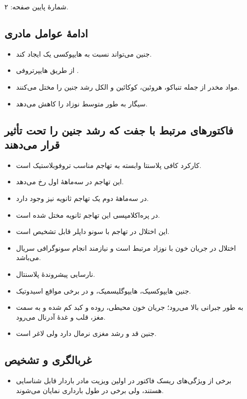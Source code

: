 \documentclass[12pt,a4paper]{article}
\begin{document}
\FGheader\par
شمارهٔ پایین صفحه: ۲.

\subsection*{ادامهٔ عوامل مادری}
\begin{itemize}
\item جنین می‌تواند نسبت به هایپوکسی یک  ایجاد کند.
\item از طریق هایپرتروفی .
\item مواد مخدر از جمله تنباکو، هروئین، کوکائین و الکل رشد جنین را مختل می‌کنند.
\item سیگار به طور متوسط  نوزاد را  کاهش می‌دهد.
\end{itemize}

\subsection*{فاکتورهای مرتبط با جفت که رشد جنین را تحت تأثیر قرار می‌دهند}
\begin{itemize}
\item کارکرد کافی پلاسنتا وابسته به تهاجم مناسب تروفوبلاستیک است.
\item این تهاجم در سه‌ماههٔ اول رخ می‌دهد.
\item در سه‌ماههٔ دوم یک تهاجم ثانویه نیز وجود دارد.
\item در پره‌اکلامپسی این تهاجم ثانویه مختل شده است.
\item این اختلال در تهاجم با سونو داپلر قابل تشخیص است.
\item اختلال در جریان خون با نوزاد  مرتبط است و نیازمند انجام سونوگرافی سریال می‌باشد.
\item نارسایی پیشروندهٔ پلاسنتال.
\item جنین هایپوکسیک، هایپوگلیسمیک، و در برخی مواقع اسیدوتیک.
\item به طور جبرانی  بالا می‌رود؛ جریان خون محیطی، روده و کبد کم شده و به سمت مغز، قلب و غدهٔ آدرنال می‌رود.
\item جنین قد و رشد مغزی نرمال دارد ولی لاغر است.
\end{itemize}

\subsection*{غربالگری و تشخیص}
\begin{itemize}
\item برخی از ویژگی‌های ریسک فاکتور  در اولین ویزیت مادر باردار قابل شناسایی هستند، ولی برخی در طول بارداری نمایان می‌شوند.
\end{itemize}
\end{document}
